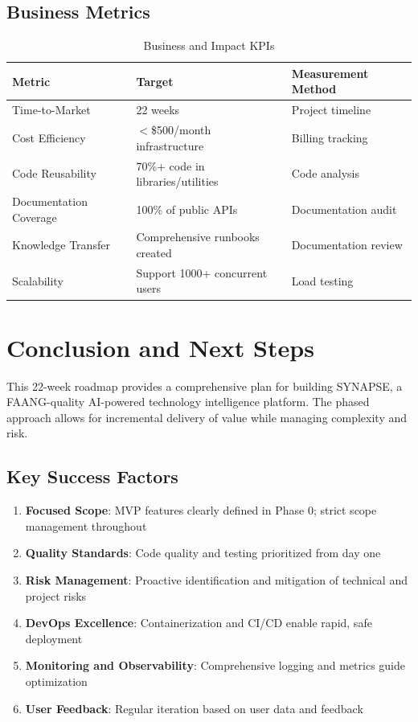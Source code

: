 \documentclass[12pt,oneside]{report}
\begin{document}
\section{Business Metrics}

\begin{table}[h]
\centering
\caption{Business and Impact KPIs}
\begin{tabular}{|p{3.5cm}|p{2.5cm}|p{3cm}|}
\hline
\rowcolor{lightblue}
\textbf{Metric} & \textbf{Target} & \textbf{Measurement Method} \\
\hline
Time-to-Market & 22 weeks & Project timeline \\
\hline
Cost Efficiency & $<$\$500/month infrastructure & Billing tracking \\
\hline
Code Reusability & 70\%+ code in libraries/utilities & Code analysis \\
\hline
Documentation Coverage & 100\% of public APIs & Documentation audit \\
\hline
Knowledge Transfer & Comprehensive runbooks created & Documentation review \\
\hline
Scalability & Support 1000+ concurrent users & Load testing \\
\hline
\end{tabular}
\end{table}

\chapter{Conclusion and Next Steps}

This 22-week roadmap provides a comprehensive plan for building SYNAPSE, a FAANG-quality AI-powered technology intelligence platform. The phased approach allows for incremental delivery of value while managing complexity and risk.

\section{Key Success Factors}

\begin{enumerate}
    \item \textbf{Focused Scope}: MVP features clearly defined in Phase 0; strict scope management throughout
    \item \textbf{Quality Standards}: Code quality and testing prioritized from day one
    \item \textbf{Risk Management}: Proactive identification and mitigation of technical and project risks
    \item \textbf{DevOps Excellence}: Containerization and CI/CD enable rapid, safe deployment
    \item \textbf{Monitoring and Observability}: Comprehensive logging and metrics guide optimization
    \item \textbf{User Feedback}: Regular iteration based on user data and feedback
\end{enumerate}
\end{document}
